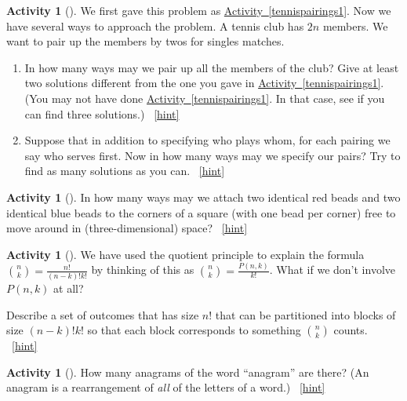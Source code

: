 \documentclass[10pt,]{book}
\theoremstyle{plain}
\theoremstyle{definition}
\theoremstyle{definition}
\theoremstyle{definition}
\newtheorem{activity}[project]{Activity}
\numberwithin{equation}{chapter}
\begin{document}
\begin{activity}[]\label{tennispairings2}
\hypertarget{p-773}{}%
We first gave this problem as \hyperref[tennispairings1]{Activity~\ref{tennispairings1}}. Now we have several ways to approach the problem. A tennis club has \(2n\) members. We want to pair up the members by twos for singles matches.%
\begin{enumerate}[font=\bfseries,label=(\alph*),ref=\alph*]
\item\label{task-147} \hypertarget{p-774}{}%
In how many ways may we pair up all the members of the club? Give at least two solutions different from the one you gave in   \hyperref[tennispairings1]{Activity~\ref{tennispairings1}}. (You may not have done \hyperref[tennispairings1]{Activity~\ref{tennispairings1}}. In that case, see if you can find three solutions.)%
~\hfill{\tiny\hyperlink{a-112.a}{[hint]}\hypertarget{q-112.a}{}}\item\label{task-148} \hypertarget{p-778}{}%
Suppose that in addition to specifying who plays whom, for each pairing we say who serves first.  Now in how many ways may we specify our pairs? Try to find as many solutions as you can.%
~\hfill{\tiny\hyperlink{a-112.b}{[hint]}\hypertarget{q-112.b}{}}\end{enumerate}
\end{activity}
\begin{activity}[]\label{twocolorsofbeads}
\hypertarget{p-782}{}%
In how many ways may we attach two identical red beads and two identical blue beads to the corners of a square (with one bead per corner) free to move around in (three-dimensional) space?%
~\hfill{\tiny\hyperlink{a-113}{[hint]}\hypertarget{q-113}{}}\end{activity}
\begin{activity}[]\label{activity-107}
\hypertarget{p-785}{}%
We have used the quotient principle to explain the formula \(\binom{n}{k} = \frac{n!}{(n-k)!k!}\) by thinking of this as \(\binom{n}{k} = \frac{P(n,k)}{k!}\).  What if we don't involve \(P(n,k)\) at all?%
\par
\hypertarget{p-786}{}%
Describe a set of outcomes that has size \(n!\) that can be partitioned into blocks of size \((n-k)!k!\) so that each block corresponds to something \(\binom{n}{k}\) counts.%
~\hfill{\tiny\hyperlink{a-114}{[hint]}\hypertarget{q-114}{}}\end{activity}
\begin{activity}[]\label{activity-108}
\hypertarget{p-789}{}%
How many anagrams of the word ``anagram'' are there? (An anagram is a rearrangement of \emph{all} of the letters of a word.)%
~\hfill{\tiny\hyperlink{a-115}{[hint]}\hypertarget{q-115}{}}\end{activity}
\typeout{************************************************}
\typeout{************************************************}
\end{document}
